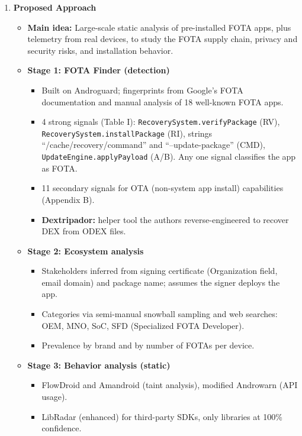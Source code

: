 \documentclass[11pt,a4paper]{article}
\newcommand{\entrypart}[1]{\textbf{\color{accent}#1}\par\vspace{2pt}}
\begin{document}
\begin{enumerate}
    \item \entrypart{Proposed Approach}

    \begin{itemize}[leftmargin=*,itemsep=1pt,topsep=2pt]
        \item \textbf{Main idea:} Large-scale static analysis of pre-installed FOTA apps, plus telemetry from real devices, to study the FOTA supply chain, privacy and security risks, and installation behavior.
        \item \textbf{Stage 1: FOTA Finder (detection)}
        \begin{itemize}[itemsep=0pt]
            \item Built on Androguard; fingerprints from Google's FOTA documentation and manual analysis of 18 well-known FOTA apps.
            \item 4 strong signals (Table I): \texttt{RecoverySystem.verifyPackage} (RV), \texttt{RecoverySystem.installPackage} (RI), strings ``/cache/recovery/command'' and ``--update-package'' (CMD), \texttt{UpdateEngine.applyPayload} (A/B). Any one signal classifies the app as FOTA.
            \item 11 secondary signals for OTA (non-system app install) capabilities (Appendix B).
            \item \textbf{Dextripador:} helper tool the authors reverse-engineered to recover DEX from ODEX files.
        \end{itemize}
        \item \textbf{Stage 2: Ecosystem analysis}
        \begin{itemize}[itemsep=0pt]
            \item Stakeholders inferred from signing certificate (Organization field, email domain) and package name; assumes the signer deploys the app.
            \item Categories via semi-manual snowball sampling and web searches: OEM, MNO, SoC, SFD (Specialized FOTA Developer).
            \item Prevalence by brand and by number of FOTAs per device.
        \end{itemize}
        \item \textbf{Stage 3: Behavior analysis (static)}
        \begin{itemize}[itemsep=0pt]
            \item FlowDroid and Amandroid (taint analysis), modified Androwarn (API usage).
            \item LibRadar (enhanced) for third-party SDKs, only libraries at 100\% confidence.

\end{itemize}
\end{itemize}
\end{enumerate}
\end{document}
